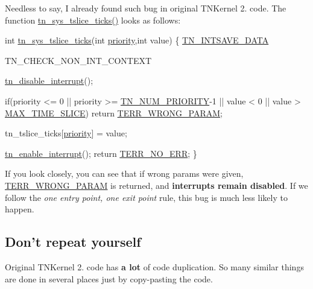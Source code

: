 Needless to say, I already found such bug in original T\+N\+Kernel 2. code. The function {\ttfamily \hyperlink{tn__oldsymbols_8h_a74b0cfd9bbf5a85f4e0d00a984f60f5e}{tn\+\_\+sys\+\_\+tslice\+\_\+ticks()}} looks as follows\+:


\begin{DoxyCode}
\textcolor{keywordtype}{int} \hyperlink{tn__oldsymbols_8h_a74b0cfd9bbf5a85f4e0d00a984f60f5e}{tn\_sys\_tslice\_ticks}(\textcolor{keywordtype}{int} \hyperlink{structTN__Task_a43c9c73249da8faa1177587786c40616}{priority},\textcolor{keywordtype}{int} value)
\{
   \hyperlink{tn__arch__example_8h_a58899c98640384b8a2cf7f9ba6f53a23}{TN\_INTSAVE\_DATA}

   TN\_CHECK\_NON\_INT\_CONTEXT

   \hyperlink{tn__oldsymbols_8h_a27bf94f93625fa36125c3fa3ae6b4041}{tn\_disable\_interrupt}();

   \textcolor{keywordflow}{if}(priority <= 0 || priority >= \hyperlink{tn__oldsymbols_8h_a63b4da81df067abd19fe86f5712a34e3}{TN\_NUM\_PRIORITY}-1 ||
                                value < 0 || value > \hyperlink{tn__oldsymbols_8h_a7a8524d52a91ba1841e95f6d4f0dcd6b}{MAX\_TIME\_SLICE})
      \textcolor{keywordflow}{return} \hyperlink{tn__oldsymbols_8h_a35ec519d54f884d84c5814f49f00a22b}{TERR\_WRONG\_PARAM};

   tn\_tslice\_ticks[\hyperlink{structTN__Task_a43c9c73249da8faa1177587786c40616}{priority}] = value;

   \hyperlink{tn__oldsymbols_8h_acc85567ca09ede9cf2d58717506def46}{tn\_enable\_interrupt}();
   \textcolor{keywordflow}{return} \hyperlink{tn__oldsymbols_8h_a71970f860643e62fad7ec03076bdc1d8}{TERR\_NO\_ERR};
\}
\end{DoxyCode}


If you look closely, you can see that if wrong params were given, {\ttfamily \hyperlink{tn__oldsymbols_8h_a35ec519d54f884d84c5814f49f00a22b}{T\+E\+R\+R\+\_\+\+W\+R\+O\+N\+G\+\_\+\+P\+A\+R\+A\+M}} is returned, and {\bfseries interrupts remain disabled}. If we follow the {\itshape one entry point, one exit point} rule, this bug is much less likely to happen.\hypertarget{why_reimplement_why_reimplement__dont_repeat_yourself}{}\subsection{Don't repeat yourself}\label{why_reimplement_why_reimplement__dont_repeat_yourself}
Original T\+N\+Kernel 2. code has {\bfseries a lot} of code duplication. So many similar things are done in several places just by copy-\/pasting the code.


